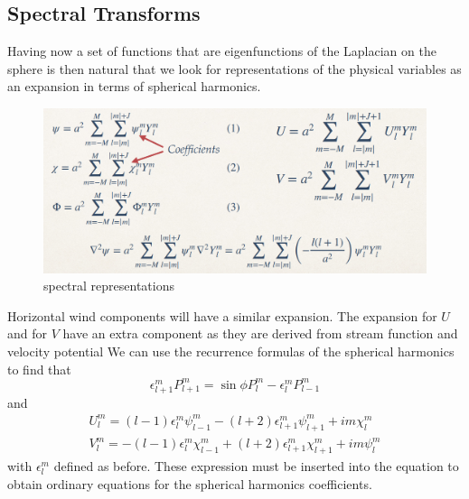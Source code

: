 \subsection{Spectral Transforms}
Having now a set of functions that are eigenfunctions of the Laplacian on the sphere is then natural that we look for representations of the physical variables as an expansion in terms of spherical harmonics. 

\begin{figure}[htpb]
    \centering
    \includegraphics[width=0.5\linewidth]{uploads/Screenshot 2024-11-17 203102.png}
    \caption{spectral representations}
    \label{fig:enter-label}
\end{figure}
Horizontal wind components will have a similar expansion. The expansion for $U$ and for $V$ have an extra component as they are derived from stream function and velocity potential We can use the recurrence formulas of the spherical harmonics to find that 
$$\epsilon_{l+1}^mP_{l+1}^m=\sin\phi P^m_l-\epsilon_l^mP^m_{l-1}$$
and 
\begin{align*}
    U_l^m=(l-1)\epsilon_l^m\psi^m_{l-1}-(l+2)\epsilon_{l+1}^m\psi_{l+1}^m+im\chi_l^m\\
    V_l^m=-(l-1)\epsilon_l^m\chi_{l-1}^m+(l+2)\epsilon_{l+1}^m\chi_{l+1}^m+im\psi_l^m
\end{align*}
with $\epsilon_l^m$ defined as before. 
These expression must be inserted into the equation to obtain ordinary equations for the spherical harmonics coefficients. 





